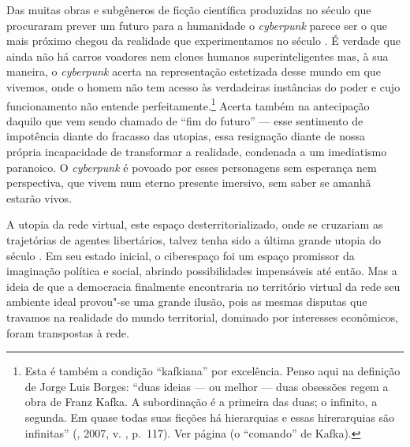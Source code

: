 Das muitas obras e subgêneros de ficção científica produzidas no século
 que procuraram prever um futuro para a humanidade o \emph{cyberpunk}
parece ser o que mais próximo chegou da realidade que experimentamos no
século . É verdade que ainda não há carros voadores nem clones
humanos superinteligentes mas, à sua maneira, o \emph{cyberpunk} acerta
na representação estetizada desse mundo em que vivemos, onde o homem não
tem acesso às verdadeiras instâncias do poder e cujo funcionamento não
entende perfeitamente.\footnote{Esta é também a condição ``kafkiana''
  por excelência. Penso aqui na definição de Jorge Luis Borges: ``duas
  ideias --- ou melhor --- duas obsessões regem a obra de Franz Kafka. A
  subordinação é a primeira das duas; o infinito, a segunda. Em quase
  todas suas ficções há hierarquias e essas hirerarquias são infinitas''
  (, 2007, v. , p.~117). Ver página  (o ``comando'' de %
  Kafka).} Acerta também na antecipação daquilo que vem sendo chamado de
``fim do futuro'' --- esse sentimento de impotência diante do fracasso
das utopias, essa resignação diante de nossa própria incapacidade de
transformar a realidade, condenada a um imediatismo paranoico. O
\emph{cyberpunk} é povoado por esses personagens sem esperança nem
perspectiva, que vivem num eterno presente imersivo, sem saber se amanhã
estarão vivos.

A utopia da rede virtual, este espaço desterritorializado, onde se
cruzariam as trajetórias de agentes libertários, talvez tenha sido a
última grande utopia do século . Em seu estado inicial, o ciberespaço
foi um espaço promissor da imaginação política e social, abrindo
possibilidades impensáveis até então. Mas a ideia de que a democracia finalmente
encontraria no território virtual da rede seu ambiente ideal
provou"-se uma grande ilusão, pois as mesmas disputas que travamos na
realidade do mundo territorial, dominado por interesses econômicos,
foram transpostas à rede.

